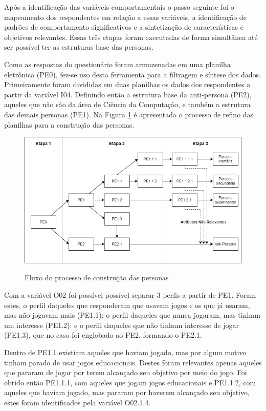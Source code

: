 \begin{apendicesenv}
Após a identificação das variáveis comportamentais o passo seguinte foi o mapeamento dos respondentes em relação a essas variáveis, a identificação de padrões de comportamento significativos e a sintetização de características e objetivos relevantes. Essas três etapas foram executadas de forma simultânea até ser possível ter as estruturas base das personas. 

Como as respostas do questionário foram armazenadas em uma planilha eletrônica (PE0), fez-se uso desta ferramenta para a filtragem e síntese dos dados. Primeiramente foram divididas em duas planilhas os dados dos respondentes a partir da variável I04. Definindo então a estrutura base da anti-persona (PE2), aqueles que não são da área de Ciência da Computação, e também a estrutura das demais personas (PE1). Na Figura \ref{Fig:persona_tree.png} é apresentada o processo de refino das planilhas para a construção das personas.

\begin{figure}[htbp]
	\centering
	\caption{Fluxo do processo de construção das personas}
	\includegraphics[keepaspectratio=true,scale=0.6]{figuras/personas/persona_tree.png}
	\label{Fig:persona_tree.png}
\end{figure}

Com a variável O02 foi possível possível separar 3 perfis a partir de PE1. Foram estes, o perfil daqueles que responderam que usavam jogos e os que já usaram, mas não jogavam mais (PE1.1); o perfil  daqueles que nunca jogaram, mas tinham um interesse (PE1.2); e o perfil daqueles que não tinham interesse de jogar (PE1.3), que no caso foi englobado ao PE2, formando o PE2.1.

Dentro de PE1.1 existiam aqueles que haviam jogado, mas por algum motivo tinham parado de usar jogos educacionais. Destes foram relevantes apenas aqueles que pararam de jogar por terem alcançado seu objetivo por meio do jogo. Foi obtido então PE1.1.1, com aqueles que jogam jogos educacionais e PE1.1.2, com aqueles que haviam jogado, mas pararam por haverem alcançado seu objetivo, estes foram identificados pela variável O02.1.4.


\end{apendicesenv}
